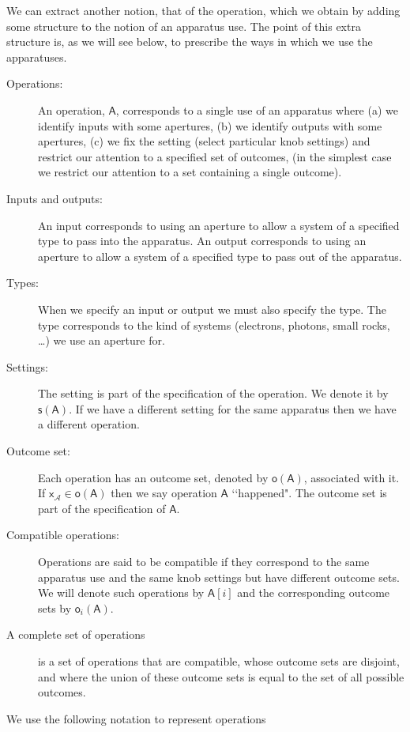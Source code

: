 \documentclass[10pt]{article}
\begin{document}
We can extract another notion, that of the operation, which we obtain by adding some structure to the notion of an apparatus use.  The point of this extra structure is, as we will see below, to prescribe the ways in which we use the apparatuses.
\begin{description}
\item[Operations:] An operation, $\mathsf A$, corresponds to a single use of an apparatus where (a) we identify inputs with some apertures, (b) we identify outputs with some apertures,  (c) we fix the setting (select particular knob settings) and restrict our attention to a specified set of outcomes,  (in the simplest case we restrict our attention to a set containing a single outcome).
\item[Inputs and outputs:] An input corresponds to using an aperture to allow a system of a specified type to pass into the apparatus.  An output corresponds to using an aperture to allow a system of a specified type to pass out of the apparatus.
\item[Types:] When we specify an input or output we must also specify the type.  The type corresponds to the kind of systems (electrons, photons, small rocks, \dots) we use an aperture for.
\item[Settings:] The setting is part of the specification of the operation.  We denote it by $\mathsf{ s(A)}$.  If we have a different setting for the same apparatus then we have a different operation.
\item[Outcome set:] Each operation has an outcome set, denoted by $\mathsf{ o(A)}$, associated with it.  If $\mathsf{x_{\mathcal A}\in o(A)}$ then we say operation $\mathsf{A}$ \lq\lq happened".  The outcome set is part of the specification of $\mathsf A$.
\item[Compatible operations:] Operations are said to be compatible if they correspond to the same apparatus use and the same knob settings but have different outcome sets.  We will denote such operations by ${\mathsf A}[i]$ and the corresponding outcome sets by ${\mathsf o}_i({\mathsf A})$.
\item[A complete set of operations] is a set of operations that are compatible, whose outcome sets are disjoint, and where the union of these outcome sets is equal to the set of all possible outcomes.
\end{description}
We use the following notation to represent operations
\end{document}
